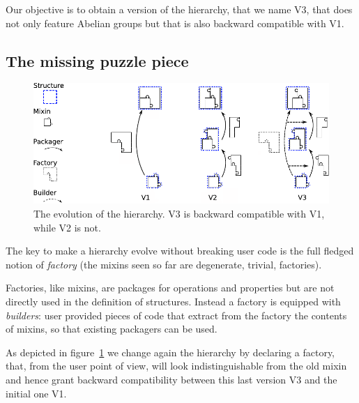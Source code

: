\documentclass[a4paper,UKenglish,cleveref, autoref]{lipics-v2019}
\newcommand{\mixin}{mixin}
\newcommand{\mixins}{mixins}
\newcommand{\factory}{factory}
\newcommand{\factories}{factories}
\newcommand{\Factories}{Factories}
\newcommand{\packager}{packager}
\newcommand{\builder}{builder}
\theoremstyle{implem}
\theoremstyle{implem}
\theoremstyle{axiom}
\theoremstyle{abscommand}
\theoremstyle{command}
\begin{document}
Our objective is to obtain a version of the hierarchy, that we name V3, that does
not only feature Abelian groups but that is also backward compatible
with V1.

\subsection{The missing puzzle piece}

\begin{figure}[!h]
  \begin{center}
    \includegraphics[width=\textwidth]{puzzle.pdf}
  \end{center}
  \caption{\label{fig:puzzle}The evolution of the hierarchy. V3 is backward compatible with V1, while V2 is not.}
\end{figure}

The key to make a hierarchy evolve without breaking user code is the full
fledged notion of \emph{\factory{}} (the \mixins{} seen so far are degenerate,
trivial, \factories{}).

\Factories{}, like \mixins{}, are packages for operations and properties but are
not directly used in the definition of structures. Instead a \factory{} is
equipped with \emph{\builder{}s}: user provided pieces of code that extract
from the \factory{} the contents of \mixins{}, so that existing
\packager{}s can be used.

As depicted in figure~\ref{fig:puzzle} we change again the hierarchy
by declaring a  \factory{}, that, from the user point of view,
will look indistinguishable from the old  \mixin{}
and hence grant backward compatibility between this last version V3 and the
initial one V1.
\end{document}
